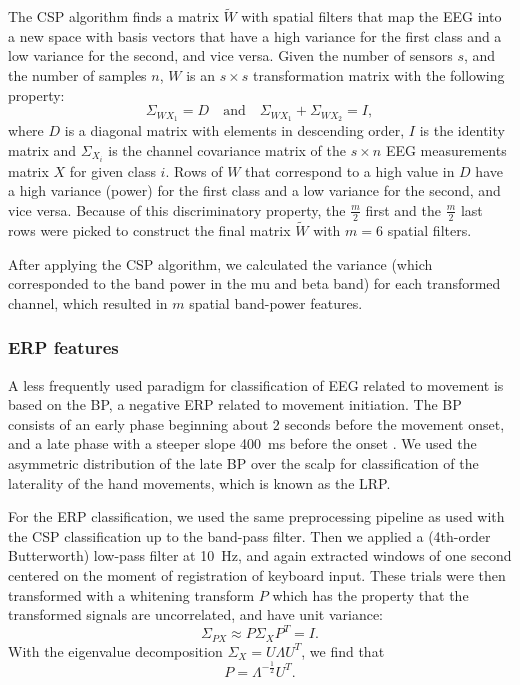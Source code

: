 The \ac{CSP} algorithm \cite{koles1991qet} finds a matrix $\tilde{W}$ with
spatial filters that map the \ac{EEG} into a new space with basis vectors that
have a high variance for the first class and a low variance for the second, and
vice versa. Given the number of sensors $s$, and the number of samples $n$,
$W$ is an $s \times s$ transformation matrix with the following property:
%
\begin{equation}
  \Sigma_{WX_1} = D \quad \textrm{and} \quad
  \Sigma_{WX_1} + \Sigma_{WX_2} = I, 
  \label{eq:CSP_BR}
\end{equation}
%
where $D$ is a diagonal matrix with elements in descending order, $I$ is
the identity matrix and $\Sigma_{X_i}$ is the channel covariance matrix of the
$s \times n$ \ac{EEG} measurements matrix $X$ for given class $i$.
%
Rows of $W$ that correspond to a high value in $D$ have a high variance (power)
for the first class and a low variance for the second, and vice versa. Because
of this discriminatory property, the $\frac{m}{2}$ first and the $\frac{m}{2}$
last rows were picked to construct the final matrix $\tilde{W}$ with $m=6$
spatial filters.

After applying the \ac{CSP} algorithm, we calculated the variance (which
corresponded to the band power in the mu and beta band) for each transformed
channel, which resulted in $m$ spatial band-power features.

\subsubsection{\protect\acs{ERP} features}
A less frequently used paradigm for classification of \ac{EEG} related to
movement is based on the \ac{BP}, a negative \ac{ERP} related to movement
initiation. The \ac{BP} consists of an early phase beginning about 2 seconds
before the movement onset, and a late phase with a steeper slope 400~ms before
the onset \cite{shibasaki2006wb}.  We used the asymmetric distribution of the
late \ac{BP} over the scalp for classification of the laterality of the hand
movements, which is known as the \ac{LRP}.

For the \ac{ERP} classification, we used the same preprocessing pipeline as
used with the \ac{CSP} classification up to the band-pass filter. Then we
applied a (4th-order Butterworth) low-pass filter at 10~Hz, and again extracted
windows of one second centered on the moment of registration of keyboard
input. These trials were then transformed with a whitening transform $P$
which has the property that the transformed signals are uncorrelated, and have
unit variance:
%
\begin{equation} 
  \Sigma_{PX} \approx P \Sigma_X P^T = I.  
\end{equation}
%
With the eigenvalue decomposition $\Sigma_X = U \Lambda U^T$, we find that
%
\begin{equation}
  P = \Lambda^{-\frac{1}{2}} U^T. 
\end{equation}


